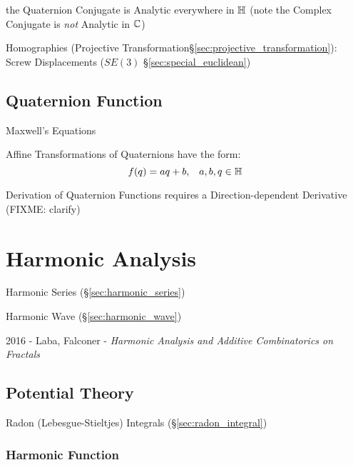 the Quaternion Conjugate is Analytic everywhere in $\mathbb{H}$
(note the Complex Conjugate is \emph{not} Analytic in $\mathbb{C}$)

Homographies (Projective Transformation\S\ref{sec:projective_transformation}):
Screw Displacements ($SE(3)$ \S\ref{sec:special_euclidean})



\subsection{Quaternion Function}\label{sec:quaternion_function}

Maxwell's Equations

Affine Transformations of Quaternions have the form:
\[
  f(q) = aq + b, \;\;\; a,b,q \in \mathbb{H}
\]

Derivation of Quaternion Functions requires a Direction-dependent Derivative
(FIXME: clarify)



\section{Harmonic Analysis}\label{sec:harmonic_analysis}

\fist Harmonic Series (\S\ref{sec:harmonic_series})

\fist Harmonic Wave (\S\ref{sec:harmonic_wave})

2016 - Laba, Falconer - \emph{Harmonic Analysis and Additive Combinatorics on
  Fractals}



\subsection{Potential Theory}\label{sec:potential_theory}

Radon (Lebesgue-Stieltjes) Integrals (\S\ref{sec:radon_integral})



\subsubsection{Harmonic Function}\label{sec:harmonic_function}

